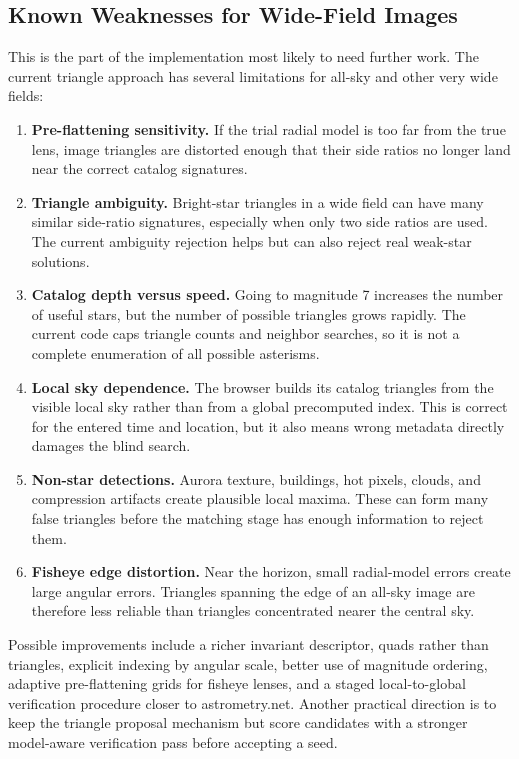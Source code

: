 \documentclass[11pt]{article}
\begin{document}
\subsection{Known Weaknesses for Wide-Field Images}

This is the part of the implementation most likely to need further work. The
current triangle approach has several limitations for all-sky and other very
wide fields:
\begin{enumerate}
  \item \textbf{Pre-flattening sensitivity.} If the trial radial model is too
        far from the true lens, image triangles are distorted enough that their
        side ratios no longer land near the correct catalog signatures.
  \item \textbf{Triangle ambiguity.} Bright-star triangles in a wide field can
        have many similar side-ratio signatures, especially when only two side
        ratios are used. The current ambiguity rejection helps but can also
        reject real weak-star solutions.
  \item \textbf{Catalog depth versus speed.} Going to magnitude 7 increases the
        number of useful stars, but the number of possible triangles grows
        rapidly. The current code caps triangle counts and neighbor searches,
        so it is not a complete enumeration of all possible asterisms.
  \item \textbf{Local sky dependence.} The browser builds its catalog triangles
        from the visible local sky rather than from a global precomputed index.
        This is correct for the entered time and location, but it also means
        wrong metadata directly damages the blind search.
  \item \textbf{Non-star detections.} Aurora texture, buildings, hot pixels,
        clouds, and compression artifacts create plausible local maxima. These
        can form many false triangles before the matching stage has enough
        information to reject them.
  \item \textbf{Fisheye edge distortion.} Near the horizon, small radial-model
        errors create large angular errors. Triangles spanning the edge of an
        all-sky image are therefore less reliable than triangles concentrated
        nearer the central sky.
\end{enumerate}

Possible improvements include a richer invariant descriptor, quads rather than
triangles, explicit indexing by angular scale, better use of magnitude ordering,
adaptive pre-flattening grids for fisheye lenses, and a staged local-to-global
verification procedure closer to astrometry.net. Another practical direction is
to keep the triangle proposal mechanism but score candidates with a stronger
model-aware verification pass before accepting a seed.
\end{document}
